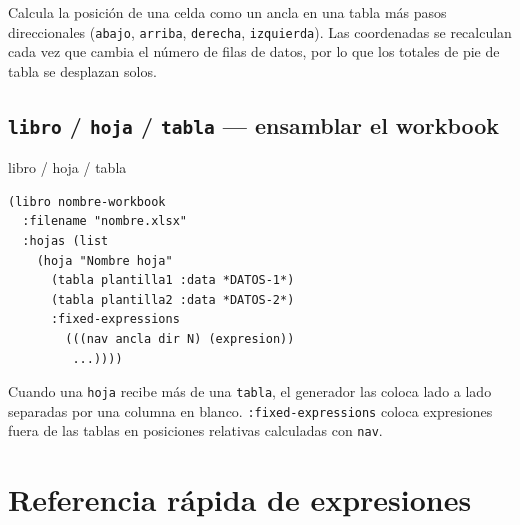 \documentclass[12pt,a4paper]{report}
\begin{document}
Calcula la posici\'on de una celda como un ancla en una tabla m\'as
pasos direccionales (\texttt{abajo}, \texttt{arriba}, \texttt{derecha},
\texttt{izquierda}).
Las coordenadas se recalculan cada vez que cambia el n\'umero de filas
de datos, por lo que los totales de pie de tabla se desplazan solos.

\subsection{\texttt{libro} / \texttt{hoja} / \texttt{tabla} --- ensamblar el workbook}

\begin{sintaxisbox}{libro / hoja / tabla}
\begin{lstlisting}
(libro nombre-workbook
  :filename "nombre.xlsx"
  :hojas (list
    (hoja "Nombre hoja"
      (tabla plantilla1 :data *DATOS-1*)
      (tabla plantilla2 :data *DATOS-2*)
      :fixed-expressions
        (((nav ancla dir N) (expresion))
         ...))))
\end{lstlisting}
\end{sintaxisbox}

Cuando una \texttt{hoja} recibe m\'as de una \texttt{tabla}, el generador
las coloca lado a lado separadas por una columna en blanco.
\texttt{:fixed-expressions} coloca expresiones fuera de las tablas en
posiciones relativas calculadas con \texttt{nav}.

\section{Referencia r\'apida de expresiones}
\label{sec:referencia}
\end{document}
